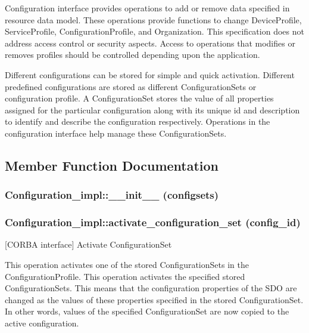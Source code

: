 Configuration interface provides operations to add or remove data specified in resource data model. These operations provide functions to change Device\-Profile, Service\-Profile, Configuration\-Profile, and Organization. This specification does not address access control or security aspects. Access to operations that modifies or removes profiles should be controlled depending upon the application.

Different configurations can be stored for simple and quick activation. Different predefined configurations are stored as different Configuration\-Sets or configuration profile. A Configuration\-Set stores the value of all properties assigned for the particular configuration along with its unique id and description to identify and describe the configuration respectively. Operations in the configuration interface help manage these Configuration\-Sets.



\subsection{Member Function Documentation}
\subsubsection{\setlength{\rightskip}{0pt plus 5cm}Configuration\_\-impl::\_\-\_\-init\_\-\_\- (configsets)}\label{classConfiguration__impl_Configuration__impla0}


\subsubsection{\setlength{\rightskip}{0pt plus 5cm}Configuration\_\-impl::activate\_\-configuration\_\-set ({\bf config\_\-id})}\label{classConfiguration__impl_Configuration__impla16}


[CORBA interface] Activate Configuration\-Set 

This operation activates one of the stored Configuration\-Sets in the Configuration\-Profile. This operation activates the specified stored Configuration\-Sets. This means that the configuration properties of the SDO are changed as the values of these properties specified in the stored Configuration\-Set. In other words, values of the specified Configuration\-Set are now copied to the active configuration.

